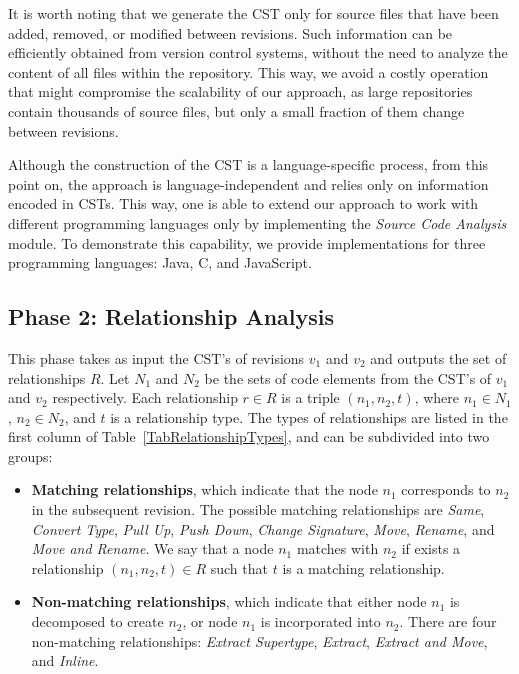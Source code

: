 \documentclass[10pt,journal,compsoc]{IEEEtran}
\begin{document}
It is worth noting that we generate the CST only for source files that have been added, removed, or modified between revisions. 
Such information can be efficiently obtained from version control systems, without the need to analyze the content of all files within the repository.
This way, we avoid a costly operation that might compromise the scalability of our approach, as large repositories contain thousands of source files, but only a small fraction of them change between revisions.

Although the construction of the CST is a language-specific process, from this point on, the approach is language-independent and relies only on information encoded in CSTs.
This way, one is able to extend our approach to work with different programming languages only by implementing the \emph{Source Code Analysis} module.
To demonstrate this capability, we provide implementations for three programming languages: Java, C, and JavaScript.


\subsection{Phase 2: Relationship Analysis}

This phase takes as input the CST's of revisions $v_1$ and $v_2$ and outputs the set of relationships $R$. Let $N_1$ and $N_2$ be the sets of code elements from the CST's of $v_1$ and $v_2$ respectively. Each relationship $r \in R$ is a triple $(n_1, n_2, t)$, where $n_1 \in N_1$, $n_2 \in N_2$, and $t$ is a relationship type. The types of relationships are listed in the first column of Table~\ref{TabRelationshipTypes}, and can be subdivided into two groups:
\begin{itemize}
\item \textbf{Matching relationships}, which indicate that the node $n_1$ corresponds to $n_2$ in the subsequent revision.
The possible matching relationships are \textit{Same}, \textit{Convert Type}, \textit{Pull Up}, \textit{Push Down}, \textit{Change Signature}, \textit{Move}, \textit{Rename}, and \textit{Move and Rename}.
We say that a node $n_1$ matches with $n_2$ if exists a relationship $(n_1, n_2, t) \in R$ such that $t$ is a matching relationship.

\item \textbf{Non-matching relationships}, which indicate that either node $n_1$ is decomposed to create $n_2$, or node $n_1$ is incorporated into $n_2$.
There are four non-matching relationships: \textit{Extract Supertype}, \textit{Extract}, \textit{Extract and Move}, and \textit{Inline}.
\end{itemize}
\end{document}

